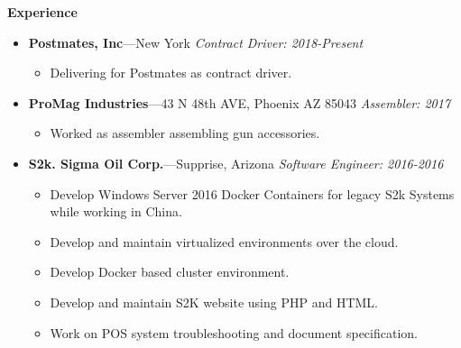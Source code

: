 \documentclass[10pt,oneside]{report}
\newenvironment{ressection}[1]{
	\vspace{1pt}
  {\normalsize\textbf{#1}}
  
  \begin{itemize}
  \vspace{1pt}
}{
 	\end{itemize}
}
\newcommand{\ressubitem}[1]{
	\vspace{-1pt}
	\item \begin{flushleft} #1 \end{flushleft}
}
\newcommand{\resbigitem}[3]{
	\vspace{1pt}
  \small
  \item
  \textbf{#1}---#2 
  \textit{#3}
}
\newenvironment{ressubsec}[3]{
	\resbigitem{#1}{#2}{#3}
  \vspace{-2pt}
	\begin{itemize}
}{
	\end{itemize}
}
\begin{document}
\begin{ressection}{Experience}
  \begin{ressubsec}{Postmates, Inc}{New York}{Contract Driver: 2018-Present}
    \ressubitem{Delivering for Postmates as contract driver.}
  \end{ressubsec}
  \begin{ressubsec}{ProMag Industries}{43 N 48th AVE, Phoenix AZ 85043}{Assembler: 2017}
    \ressubitem{Worked as assembler assembling gun accessories.}
  \end{ressubsec}
  \begin{ressubsec}{S2k. Sigma Oil Corp.}{Supprise, Arizona}{Software Engineer: 2016-2016}
    \ressubitem{Develop Windows Server 2016 Docker Containers for legacy S2k Systems while working in China.}
    \ressubitem{Develop and maintain virtualized environments over the cloud.}
    \ressubitem{Develop Docker based cluster environment.}
    \ressubitem{Develop and maintain S2K website using PHP and HTML.}
    \ressubitem{Work on POS system troubleshooting and document specification.}
    \end{ressubsec}
  

\end{ressection}
\end{document}
